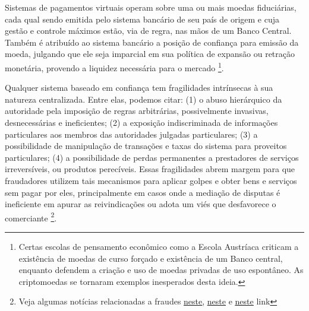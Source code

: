 \documentclass[a4paper,11pt]{article}
\newcommand{\link}[2]{{\color{blue}\underline{\href{#1}{#2}}}}
\begin{document}
Sistemas de pagamentos virtuais operam sobre uma ou mais moedas fiduciárias, cada qual sendo emitida pelo sistema bancário de seu país de origem e cuja gestão e controle máximos estão, via de regra, nas mãos de um Banco Central.
Também é atribuído ao sistema bancário a posição de confiança para emissão da moeda, julgando que ele seja imparcial em sua política de expansão ou retração monetária, provendo a liquidez necessária para o mercado
\footnote{Certas escolas de pensamento econômico como a Escola Austríaca \cite{Mises1960, Rothbard2013} criticam a existência de moedas de curso forçado e existência de um Banco central, enquanto defendem a criação e uso de moedas privadas de uso espontâneo. As criptomoedas se tornaram exemplos inesperados desta ideia.}.

Qualquer sistema baseado em confiança tem fragilidades intrínsecas à sua natureza centralizada. Entre elas, podemos citar: (1) o abuso hierárquico da autoridade pela imposição de regras arbitrárias, possivelmente invasivas, desnecessárias e ineficientes; (2) a exposição indiscriminada de informações particulares aos membros das autoridades julgadas particulares; (3) a possibilidade de manipulação de transações e taxas do sistema para proveitos particulares; (4) %
a possibilidade de perdas permanentes a prestadores de serviços irreversíveis, ou produtos perecíveis. Essas fragilidades abrem margem para que fraudadores utilizem tais mecanismos para aplicar golpes e obter bens e serviços sem pagar por eles, principalmente em casos onde a mediação de disputas é ineficiente em apurar as reivindicações ou adota um viés que desfavorece o comerciante
\footnote{Veja algumas notícias relacionadas a fraudes \link{https://canaltech.com.br/e-commerce/golpe-pedra-mercado-livre-115288/}{neste}, \link{https://www.techtudo.com.br/noticias/2019/07/golpe-da-compra-falsa-faz-vitimas-no-mercado-livre-veja-como-evitar.ghtml}{neste} e \link{https://www.coindesk.com/how-fraud-sunk-bitcoin-exchange}{neste} link}.
\end{document}
